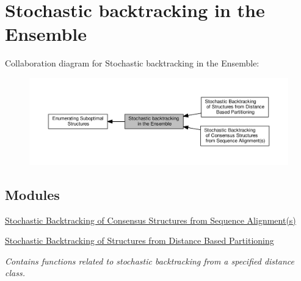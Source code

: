 \hypertarget{group__subopt__stochbt}{}\section{Stochastic backtracking in the Ensemble}
\label{group__subopt__stochbt}
Collaboration diagram for Stochastic backtracking in the Ensemble\+:
\nopagebreak
\begin{figure}[H]
\begin{center}
\leavevmode
\includegraphics[width=350pt]{group__subopt__stochbt}
\end{center}
\end{figure}
\subsection*{Modules}
\begin{DoxyCompactItemize}
\item 
\hyperlink{group__consensus__stochbt}{Stochastic Backtracking of Consensus Structures from Sequence Alignment(s)}
\item 
\hyperlink{group__kl__neighborhood__stochbt}{Stochastic Backtracking of Structures from Distance Based Partitioning}
\begin{DoxyCompactList}\small\item\em Contains functions related to stochastic backtracking from a specified distance class. \end{DoxyCompactList}\end{DoxyCompactItemize}
